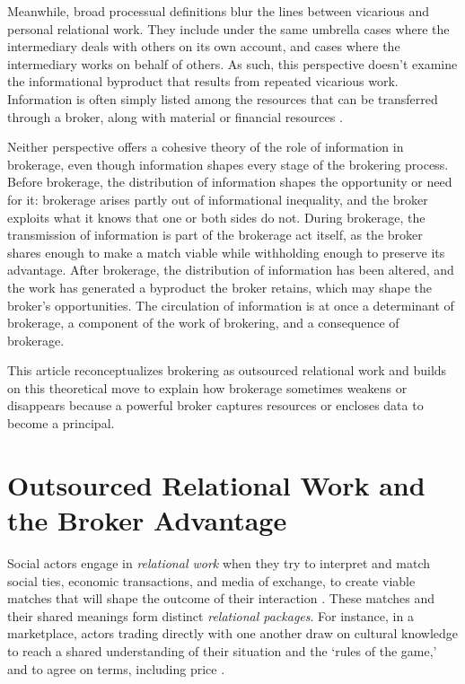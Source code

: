 \documentclass[
]{article}
\begin{document}
Meanwhile, broad processual definitions blur the lines between vicarious and personal relational work. They include under the same umbrella cases where the intermediary deals with others on its own account, and cases where the intermediary works on behalf of others. As such, this perspective doesn't examine the informational byproduct that results from repeated vicarious work. Information is often simply listed among the resources that can be transferred through a broker, along with material or financial resources \autocites[see e.g.][141]{obstfeldBrokerageProcessDecoupling2014}[141]{stovelBrokerage2012}.

Neither perspective offers a cohesive theory of the role of information in brokerage, even though information shapes every stage of the brokering process. Before brokerage, the distribution of information shapes the opportunity or need for it: brokerage arises partly out of informational inequality, and the broker exploits what it knows that one or both sides do not. During brokerage, the transmission of information is part of the brokerage act itself, as the broker shares enough to make a match viable while withholding enough to preserve its advantage. After brokerage, the distribution of information has been altered, and the work has generated a byproduct the broker retains, which may shape the broker's opportunities. The circulation of information is at once a determinant of brokerage, a component of the work of brokering, and a consequence of brokerage.

This article reconceptualizes brokering as outsourced relational work and builds on this theoretical move to explain how brokerage sometimes weakens or disappears because a powerful broker captures resources or encloses data to become a principal.

\section{Outsourced Relational Work and the Broker Advantage}

Social actors engage in \emph{relational work} when they try to interpret and match social ties, economic transactions, and media of exchange, to create viable matches that will shape the outcome of their interaction \autocites[151]{zelizerHowBecameRelational2012}{zelizerPurchaseIntimacy2005} \autocite[see also][255]{bandeljRelationalWorkEconomy2020}. These matches and their shared meanings form distinct \emph{relational packages}. For instance, in a marketplace, actors trading directly with one another draw on cultural knowledge to reach a shared understanding of their situation and the `rules of the game,' and to agree on terms, including price \autocite[137]{blockRelationalWorkMarket2012}.
\end{document}
